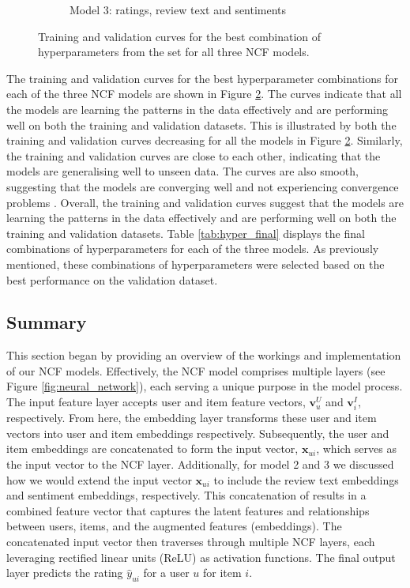 \begin{figure}[h]
\begin{subfigure}{0.49\textwidth}
        \caption{Model 3: ratings, review text and sentiments}
        \label{fig:model3}
    \end{subfigure}
    \caption{Training and validation curves for the best combination of hyperparameters from the set for all three NCF models.}
    \label{fig:train_val curves final}
\end{figure}


The training and validation curves for the best hyperparameter combinations for each of the three NCF models are shown in Figure \ref{fig:train_val curves final}. The curves indicate that all the models are learning the patterns in the data effectively and are performing well on both the training and validation datasets. This is illustrated by both the training and validation curves decreasing for all the models in Figure \ref{fig:train_val curves final}. Similarly, the training and validation curves are close to each other, indicating that the models are generalising well to unseen data. The curves are also smooth, suggesting that the models are converging well and not experiencing convergence problems \cite{bergstra2011algorithms}. Overall, the training and validation curves suggest that the models are learning the patterns in the data effectively and are performing well on both the training and validation datasets. Table \ref{tab:hyper_final} displays the final combinations of hyperparameters for each of the three models. As previously mentioned, these combinations of hyperparameters were selected based on the best performance on the validation dataset. 


\subsection{Summary}
\label{sec:4 Summary for NCF}

This section began by providing an overview of the workings and implementation of our NCF models. Effectively, the NCF model comprises multiple layers (see Figure \ref{fig:neural_network}), each serving a unique purpose in the model process. The input feature layer accepts user and item feature vectors, $\mathbf{v}_u^U$ and $\mathbf{v}_i^I$, respectively. From here, the embedding layer transforms these user and item vectors into user and item embeddings respectively. Subsequently, the user and item embeddings are concatenated to form the input vector, $\mathbf{x}_{ui}$, which serves as the input vector to the NCF layer. Additionally, for model 2 and 3 we discussed how we would extend the input vector $\mathbf{x}_{ui}$ to include the review text embeddings and sentiment embeddings, respectively. This concatenation of results in a combined feature vector that captures the latent features and relationships between users, items, and the augmented features (embeddings). The concatenated input vector then traverses through multiple NCF layers, each leveraging rectified linear units (ReLU) as activation functions. The final output layer predicts the rating $\hat{y}_{u i}$ for a user $u$ for item $i$. 

